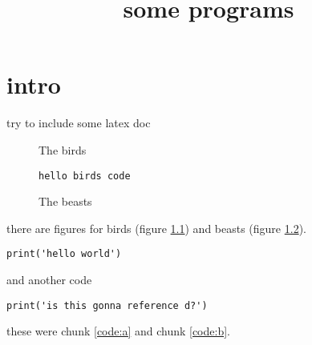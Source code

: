 \documentclass[a4paper]{report}
\begin{document}

\title{some programs}

\maketitle
\tableofcontents

\chapter{intro}\label{ch:intro}

try to include some latex doc

\begin{figure}[h!]
  \caption{The birds}
  \label{fig:birds}
\end{figure}

\begin{figure}[h!]
\begin{verbatim}
hello birds code
\end{verbatim}
  \caption{The beasts}
  \label{fig:beasts}
\end{figure}

there are figures for birds (figure \ref{fig:birds}) and beasts (figure \ref{fig:beasts}).


\begin{code}
  

\begin{verbatim}
print('hello world')
\end{verbatim}

\captionlistentry{}
\label{code:a}

\end{code}

and another code

\begin{code}
\begin{verbatim}
print('is this gonna reference d?')
\end{verbatim}
\captionlistentry{}
\label{code:b}
\end{code}

these were chunk \ref{code:a} and chunk \ref{code:b}.
\end{document}

